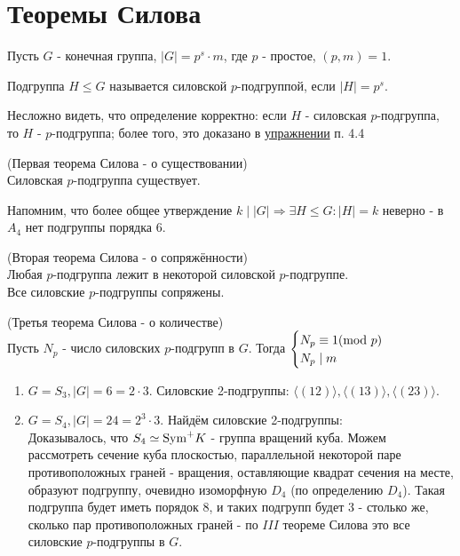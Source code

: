 \section{Теоремы Силова}
Пусть $G$ - конечная группа, $|G| = p^s \cdot m$, где $p$ - простое, $(p, m) = 1$.
\begin{definition}
    Подгруппа $H \leq G$ называется силовской $p$-подгруппой, если $|H| = p^s$.
\end{definition}
\begin{remark}
    Несложно видеть, что определение корректно: если $H$ - силовская $p$-подгруппа, то $H$ - $p$-подгруппа; более того, это доказано в \hyperref[ex:ex1]{упражнении} п. 4.4
\end{remark}
\begin{theoremnum}(Первая теорема Силова - о существовании)\\
    Силовская $p$-подгруппа существует.   
\end{theoremnum}
\begin{remark}
    Напомним, что более общее утверждение $k \mid |G| \Longrightarrow \exists H \leq G: |H| = k$ неверно - в $A_4$ нет подгруппы порядка 6.
\end{remark}
\begin{theoremnum}(Вторая теорема Силова - о сопряжённости)\\
    Любая $p$-подгруппа лежит в некоторой силовской $p$-подгруппе.\\
    Все силовские $p$-подгруппы сопряжены.
\end{theoremnum}
\begin{theoremnum}(Третья теорема Силова - о количестве)\\
    Пусть $N_p$ - число силовских $p$-подгрупп в $G$. Тогда $\begin{cases}
        N_p \equiv 1(\textup{mod } p) \\
        N_p \mid m
    \end{cases}$
\end{theoremnum}
\begin{examples}\tab
    \begin{enumerate}
        \item $G = S_3, |G| = 6 = 2\cdot 3$. Силовские 2-подгруппы: $\langle (12) \rangle, \langle (13) \rangle, \langle (23) \rangle$.
        \item $G = S_4, |G| = 24 = 2^3\cdot 3$. Найдём силовские 2-подгруппы:\\
        Доказывалось, что $S_4 \simeq \textup{Sym}^+ K$ - группа вращений куба. Можем рассмотреть сечение куба плоскостью, параллельной некоторой паре противоположных граней - вращения, оставляющие квадрат сечения на месте, образуют подгруппу, очевидно изоморфную $D_4$ (по определению $D_4$). Такая подгруппа будет иметь порядок 8, и таких подгрупп будет 3 - столько же, сколько пар противоположных граней - по $III$ теореме Силова это все силовские $p$-подгруппы в $G$.
    \end{enumerate}
\end{examples}

